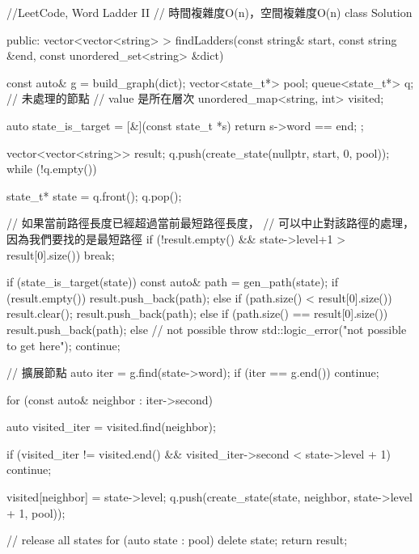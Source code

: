 \begin{Code}
//LeetCode, Word Ladder II
// 時間複雜度O(n)，空間複雜度O(n)
class Solution {
public:
    vector<vector<string> > findLadders(const string& start,
            const string &end, const unordered_set<string> &dict) {
        const auto& g = build_graph(dict);
        vector<state_t*> pool;
        queue<state_t*> q; // 未處理的節點
        // value 是所在層次
        unordered_map<string, int> visited;

        auto state_is_target = [&](const state_t *s) {return s->word == end; };

        vector<vector<string>> result;
        q.push(create_state(nullptr, start, 0, pool));
        while (!q.empty()) {
            state_t* state = q.front();
            q.pop();

            // 如果當前路徑長度已經超過當前最短路徑長度，
            // 可以中止對該路徑的處理，因為我們要找的是最短路徑
            if (!result.empty() && state->level+1 > result[0].size()) break;

            if (state_is_target(state)) {
                const auto& path = gen_path(state);
                if (result.empty()) {
                    result.push_back(path);
                } else {
                    if (path.size() < result[0].size()) {
                        result.clear();
                        result.push_back(path);
                    } else if (path.size() == result[0].size()) {
                        result.push_back(path);
                    } else {
                        // not possible
                        throw std::logic_error("not possible to get here");
                    }
                }
                continue;
            }

            // 擴展節點
            auto iter = g.find(state->word);
            if (iter == g.end()) continue;

            for (const auto& neighbor : iter->second) {
                auto visited_iter = visited.find(neighbor);

                if (visited_iter != visited.end() && 
                    visited_iter->second < state->level + 1) {
                    continue;
                }

                visited[neighbor] = state->level;
                q.push(create_state(state, neighbor, state->level + 1, pool));
            }
        }

        // release all states
        for (auto state : pool) {
            delete state;
        }
        return result;
    }

}
\end{Code}
